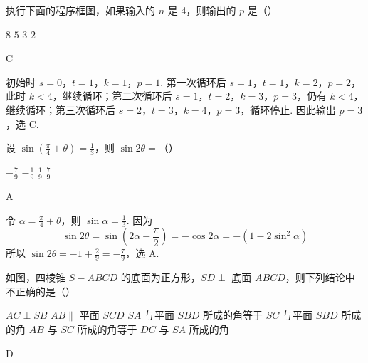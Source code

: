 \begin{problem}
执行下面的程序框图，如果输入的 \(n\) 是 4，则输出的 \(p\) 是（\quad）


\choices
    {\(8\)}
    {\(5\)}
    {\(3\)}
    {\(2\)}
\end{problem}

\begin{answer}
C
\end{answer}

\begin{solution}
初始时 \(s=0\)，\(t=1\)，\(k=1\)，\(p=1\). 第一次循环后 \(s=1\)，\(t=1\)，\(k=2\)，\(p=2\)，此时 \(k<4\)，继续循环；第二次循环后 \(s=1\)，\(t=2\)，\(k=3\)，\(p=3\)，仍有 \(k<4\)，继续循环；第三次循环后 \(s=2\)，\(t=3\)，\(k=4\)，\(p=3\)，循环停止. 因此输出 \(p=3\)，选 C.
\end{solution}

\begin{problem}
设 \(\sin \left(\frac{\pi}{4} + \theta\right) = \frac{1}{3}\)，则 \(\sin 2\theta =\)（\quad）

\choices
    {\(-\frac{7}{9}\)}
    {\(-\frac{1}{9}\)}
    {\( \frac{1}{9} \)}
    {\( \frac{7}{9} \)}
\end{problem}

\begin{answer}
A
\end{answer}

\begin{solution}
令 \(\alpha=\frac\pi4+\theta\)，则 \(\sin\alpha=\frac13\). 因为
\[
\sin2\theta=\sin\left(2\alpha-\frac\pi2\right)=-\cos2\alpha=-(1-2\sin^{2}\alpha)
\]
所以 \(\sin2\theta=-1+\frac29=-\frac79\)，选 A.
\end{solution}

\begin{problem}
如图，四棱锥 \(S - ABCD\) 的底面为正方形，\(SD \perp\) 底面 \(ABCD\)，则下列结论中不正确的是（\quad）


\choices
    {\(AC \perp SB\)}
    {\(AB\parallel\) 平面 \(SCD\)}
    {\(SA\) 与平面 \(SBD\) 所成的角等于 \(SC\) 与平面 \(SBD\) 所成的角}
    {\(AB\) 与 \(SC\) 所成的角等于 \(DC\) 与 \(SA\) 所成的角}
\end{problem}

\begin{answer}
D
\end{answer}

